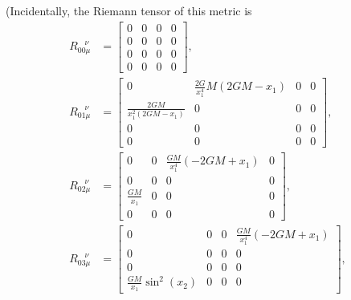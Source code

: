 \documentclass[10pt,onecolumn,dvipdfmx]{article}
\begin{document}
(Incidentally, the Riemann tensor of this metric is 
\begin{align}
R_{00\mu }^{\ \ \ \ \nu } &=\left[\begin{matrix}0 & 0 & 0 & 0\\0 & 0 & 0 & 0\\0 & 0 & 0 & 0\\0 & 0 & 0 & 0\end{matrix}\right], \\
R_{01\mu }^{\ \ \ \ \nu } &=\left[\begin{matrix}0 & \frac{2 G}{x_{1}^{4}} M \left(2 G M - x_{1}\right) & 0 & 0\\\frac{2 G M}{x_{1}^{2} \left(2 G M - x_{1}\right)} & 0 & 0 & 0\\0 & 0 & 0 & 0\\0 & 0 & 0 & 0\end{matrix}\right], \\
R_{02\mu }^{\ \ \ \ \nu } &=\left[\begin{matrix}0 & 0 & \frac{G M}{x_{1}^{4}} \left(- 2 G M + x_{1}\right) & 0\\0 & 0 & 0 & 0\\\frac{G M}{x_{1}} & 0 & 0 & 0\\0 & 0 & 0 & 0\end{matrix}\right], \\
R_{03\mu }^{\ \ \ \ \nu } &=\left[\begin{matrix}0 & 0 & 0 & \frac{G M}{x_{1}^{4}} \left(- 2 G M + x_{1}\right)\\0 & 0 & 0 & 0\\0 & 0 & 0 & 0\\\frac{G M}{x_{1}} \sin^{2}{\left (x_{2} \right )} & 0 & 0 & 0\end{matrix}\right], 
\end{align}
\end{document}
